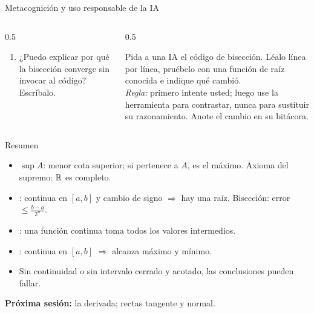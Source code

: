 \documentclass[10pt,aspectratio=169]{beamer}
\begin{document}
\begin{frame}{Metacognición y uso responsable de la IA}
  \small
  \begin{columns}[t]
    \begin{column}{0.5\textwidth}
      \begin{metacog}
        \begin{enumerate}
          \metacomun
          \item ¿Puedo explicar por qué la bisección converge sin invocar al código? Escríbalo.
        \end{enumerate}
      \end{metacog}
    \end{column}
    \begin{column}{0.5\textwidth}
      \begin{iabox}
        Pida a una IA el código de bisección. Léalo línea por línea, pruébelo con una función de raíz conocida e indique qué cambió.\\[2pt]
        \textit{Regla:} primero intente usted; luego use la herramienta para contrastar, nunca para sustituir su razonamiento. Anote el cambio en su bitácora.
      \end{iabox}
    \end{column}
  \end{columns}
\end{frame}

\begin{frame}{Resumen}
  \begin{itemize}
    \item $\sup A$: menor cota superior; si pertenece a $A$, es el máximo. Axioma del supremo: $\mathbb{R}$ es completo.
    \item {}: continua en $[a,b]$ y cambio de signo $\Rightarrow$ hay una raíz. Bisección: error $\le\frac{b-a}{2^n}$.
    \item {}: una función continua toma todos los valores intermedios.
    \item {}: continua en $[a,b]$ $\Rightarrow$ alcanza máximo y mínimo.
    \item Sin continuidad o sin intervalo cerrado y acotado, las conclusiones pueden fallar.
  \end{itemize}
  \vspace{3mm}
  \textbf{Próxima sesión:} la derivada; rectas tangente y normal.
\end{frame}
\end{document}
